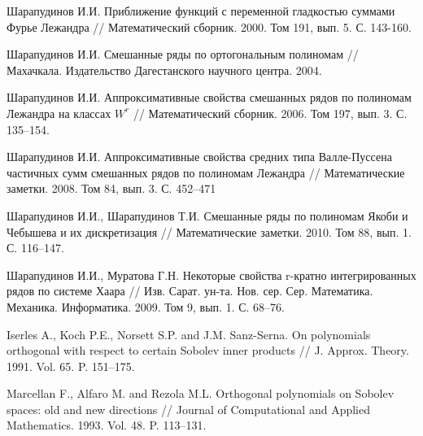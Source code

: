 \begin{thebibliography}{999}

 Шарапудинов И.И. Приближение функций с переменной гладкостью суммами Фурье Лежандра // Математический сборник. 2000. Том 191, вып. 5. С. 143-160.




 Шарапудинов И.И. Смешанные ряды по ортогональным полиномам // Махачкала. Издательство Дагестанского научного центра. 2004.




 Шарапудинов И.И. Аппроксимативные свойства смешанных рядов по полиномам Лежандра на классах $W^r$ // Математический сборник. 2006. Том 197, вып. 3. С. 135--154.




 Шарапудинов И.И. Аппроксимативные свойства средних типа Валле-Пуссена частичных сумм смешанных рядов по полиномам Лежандра // Математические заметки. 2008. Том 84, вып. 3. С. 452--471




 Шарапудинов И.И., Шарапудинов Т.И. Смешанные ряды по полиномам Якоби и Чебышева и их дискретизация // Математические заметки. 2010. Том 88, вып. 1. С. 116--147.




 Шарапудинов И.И.,  Муратова Г.Н. Некоторые свойства r-кратно интегрированных рядов по системе Хаара // Изв. Сарат. ун-та. Нов. сер. Сер. Математика. Механика. Информатика. 2009. Том 9, вып. 1. С. 68--76.




 Iserles A., Koch P.E., Norsett S.P. and J.M. Sanz-Serna. On polynomials  orthogonal  with respect  to certain Sobolev inner products // J. Approx. Theory. 1991. Vol. 65. P. 151--175.




 Marcellan F., Alfaro M. and Rezola M.L. Orthogonal polynomials on Sobolev spaces: old and new directions // Journal of Computational and Applied Mathematics. 1993. Vol. 48. P. 113--131.




\end{thebibliography}
